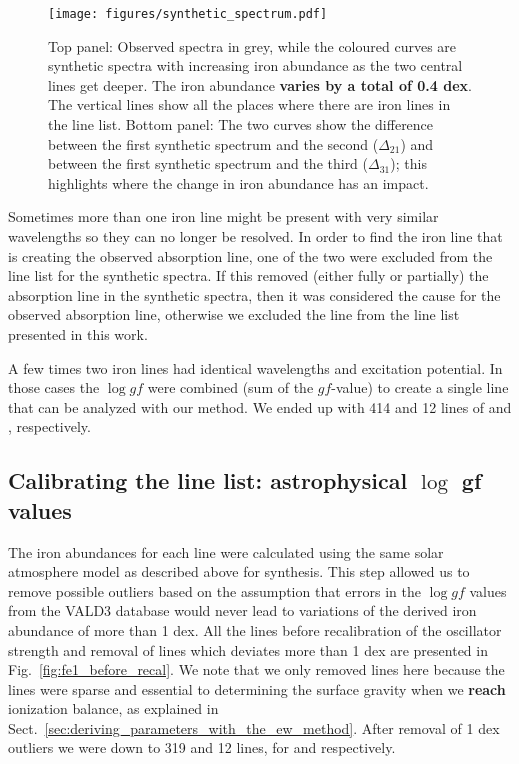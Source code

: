 \documentclass{aa}
\begin{document}
\begin{figure}[tpb]
    \centering
    \texttt{[image: figures/synthetic\_spectrum.pdf]}
    \caption{Top panel: Observed spectra in grey, while the
    coloured curves are synthetic spectra with increasing iron abundance
    as the two central lines get deeper. The iron abundance \textbf{varies by a total
    of 0.4 dex}. The vertical lines show all the places where there are
    iron lines in the line list. Bottom panel: The two curves show
    the difference between the first synthetic spectrum and the second
    ($\Delta_{21}$) and between the first synthetic
    spectrum and the third ($\Delta_{31}$); this highlights
    where the change in iron abundance has an impact.}
    \label{fig:synthesis}
\end{figure}


Sometimes more than one iron line might be present with very similar
wavelengths so they can no longer be resolved. In order to find the
iron line that is creating the observed absorption line, one of the two
were excluded from the line list for the synthetic spectra. If this
removed (either fully or partially) the absorption line in the synthetic
spectra, then it was considered the cause for the observed absorption
line, otherwise we excluded the line from the line list presented in
this work.

A few times two iron lines had identical wavelengths and excitation
potential. In those cases the $\log \mathit{gf}$ were combined (sum of
the $\mathit{gf}$-value) to create a single line that can be analyzed
with our method. We ended up with 414 and 12 lines of  and
, respectively.


\subsection{Calibrating the line list: astrophysical $\log$ gf values}
\label{ssub:Recalibrating-the-atomic-data}

The iron abundances for each line were calculated using the same
solar atmosphere model as described above for synthesis. This step
allowed us to remove possible outliers based on the assumption that
errors in the $\log \mathit{gf}$ values from the VALD3 database
would never lead to variations of the derived iron abundance of
more than 1 dex. All the  lines before recalibration
of the oscillator strength and removal of lines which deviates
more than 1 dex are presented in Fig.~\ref{fig:fe1_before_recal}.
We note that we only removed  lines here because the
 lines were sparse and essential to determining the
surface gravity when we \textbf{reach} ionization balance, as explained in
Sect.~\ref{sec:deriving_parameters_with_the_ew_method}. After removal
of 1 dex outliers we were down to 319 and 12 lines, for  and
 respectively.
\end{document}
